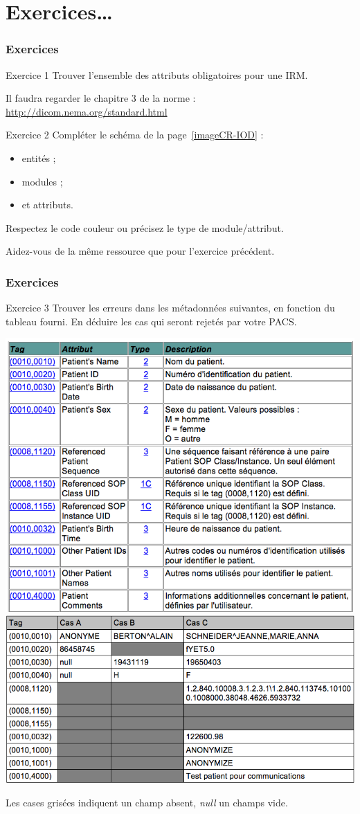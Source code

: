 \section{Exercices\ldots}

	\frame
	{
		\frametitle{Exercices}
		
			\begin{block}{Exercice 1}
				Trouver l'ensemble des attributs obligatoires pour une IRM.

				Il faudra regarder le chapitre 3 de la norme : \url{http://dicom.nema.org/standard.html}
			\end{block}

			\begin{block}{Exercice 2}
				Compl\'eter le sch\'ema de la page~\ref{imageCR-IOD} :
				\begin{itemize}
					\item entit\'es ;
					\item modules ;
					\item et attributs.
				\end{itemize}
				Respectez le code couleur ou pr\'ecisez le type de module/attribut.

				Aidez-vous de la m\^eme ressource que pour l'exercice pr\'ec\'edent.
			\end{block}

	}

\frame
{
	\frametitle{Exercices}
	\begin{block}{Exercice 3}
    		Trouver les erreurs dans les m\'etadonn\'ees suivantes, en fonction du tableau fourni.
    		En d\'eduire les cas qui seront rejet\'es par votre PACS.

		\includegraphics[width=.5\linewidth]{./figures/table.png}
		\includegraphics[width=.5\linewidth]{./figures/metadata-cases.png}
    
    		Les cases gris\'ees indiquent un champ absent, \emph{null} un champs vide.
	\end{block}
}

